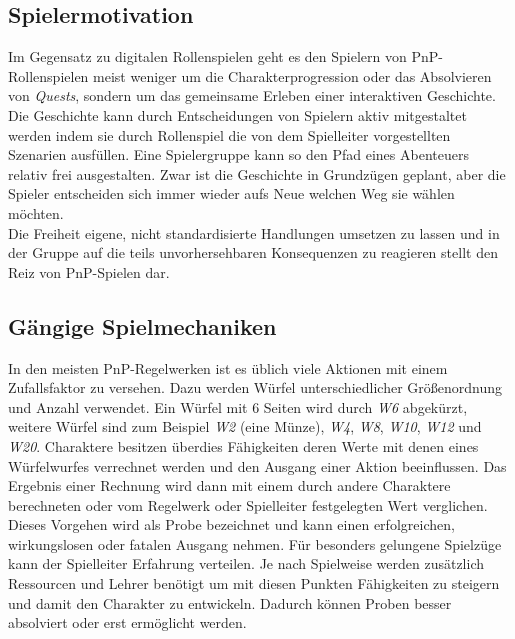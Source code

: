 \subsection{Spielermotivation}
\label{sec:Spielermotivation}

Im Gegensatz zu digitalen Rollenspielen geht es den Spielern von PnP-Rollenspielen meist weniger um die Charakterprogression oder das Absolvieren von \emph{Quests}, sondern um das gemeinsame Erleben einer interaktiven Geschichte. Die Geschichte kann durch Entscheidungen von Spielern aktiv mitgestaltet werden indem sie durch Rollenspiel die von dem Spielleiter vorgestellten Szenarien ausfüllen. Eine Spielergruppe kann so den Pfad eines Abenteuers relativ frei ausgestalten. Zwar ist die Geschichte in Grundzügen geplant, aber die Spieler entscheiden sich immer wieder aufs Neue welchen Weg sie wählen möchten. \cite{Arinbjarnar}\\
Die Freiheit eigene, nicht standardisierte Handlungen umsetzen zu lassen und in der Gruppe auf die teils unvorhersehbaren Konsequenzen zu reagieren stellt den Reiz von PnP-Spielen dar. 


\subsection{Gängige Spielmechaniken}
\label{sec:Spielmechaniken}

In den meisten PnP-Regelwerken ist es üblich viele Aktionen mit einem Zufallsfaktor zu versehen. Dazu werden Würfel unterschiedlicher Größenordnung und Anzahl verwendet. Ein Würfel mit 6 Seiten wird durch \textit{W6} abgekürzt, weitere Würfel sind zum Beispiel \textit{W2} (eine Münze), \textit{W4}, \textit{W8}, \textit{W10}, \textit{W12} und \textit{W20}.\newline
Charaktere besitzen überdies Fähigkeiten deren Werte mit denen eines Würfelwurfes verrechnet werden und den Ausgang einer Aktion beeinflussen. Das Ergebnis einer Rechnung wird dann mit einem durch andere Charaktere berechneten oder vom Regelwerk oder Spielleiter festgelegten Wert verglichen. Dieses Vorgehen wird als Probe bezeichnet und kann einen erfolgreichen, wirkungslosen oder fatalen Ausgang nehmen.\newline
Für besonders gelungene Spielzüge kann der Spielleiter Erfahrung verteilen. Je nach Spielweise werden zusätzlich Ressourcen und Lehrer benötigt um mit diesen Punkten Fähigkeiten zu steigern und damit den Charakter zu entwickeln. Dadurch können Proben besser absolviert oder erst ermöglicht werden.

